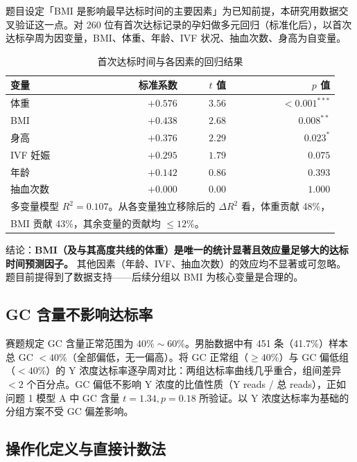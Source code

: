 \documentclass{mcm-paper}
\begin{document}
题目设定「BMI 是影响最早达标时间的主要因素」为已知前提，本研究用数据交叉验证这一点。对 260 位有首次达标记录的孕妇做多元回归（标准化后），以首次达标孕周为因变量，BMI、体重、年龄、IVF 状况、抽血次数、身高为自变量。

\begin{table}[H]
\centering
\caption{首次达标时间与各因素的回归结果}
\begin{tabular}{lrrr}
\toprule
变量 & 标准系数 & $t$ 值 & $p$ 值 \\
\midrule
体重     & $+0.576$ & $3.56$ & $<0.001^{***}$ \\
BMI     & $+0.438$ & $2.68$ & $0.008^{**}$ \\
身高     & $+0.376$ & $2.29$ & $0.023^*$ \\
IVF 妊娠 & $+0.295$ & $1.79$ & $0.075$ \\
年龄     & $+0.142$ & $0.86$ & $0.393$ \\
抽血次数   & $+0.000$ & $0.00$ & $1.000$ \\
\bottomrule
\multicolumn{4}{l}{\footnotesize 多变量模型 $R^2=0.107$。从各变量独立移除后的 $\Delta R^2$ 看，体重贡献 48\%，} \\
\multicolumn{4}{l}{\footnotesize BMI 贡献 43\%，其余变量的贡献均 $\leq 12\%$。} \\
\end{tabular}
\end{table}

结论：\textbf{BMI（及与其高度共线的体重）是唯一的统计显著且效应量足够大的达标时间预测因子。} 其他因素（年龄、IVF、抽血次数）的效应均不显著或可忽略。题目前提得到了数据支持——后续分组以 BMI 为核心变量是合理的。

\subsection{GC 含量不影响达标率}

赛题规定 GC 含量正常范围为 $40\%\sim60\%$。男胎数据中有 451 条（41.7\%）样本总 GC $< 40\%$（全部偏低，无一偏高）。将 GC 正常组（$\geq 40\%$）与 GC 偏低组（$<40\%$）的 Y 浓度达标率逐孕周对比：两组达标率曲线几乎重合，组间差异 $<2$ 个百分点。GC 偏低不影响 Y 浓度的比值性质（Y reads / 总 reads），正如问题 1 模型 A 中 GC 含量 $t=1.34, p=0.18$ 所验证。以 Y 浓度达标率为基础的分组方案不受 GC 偏差影响。

\subsection{操作化定义与直接计数法}
\end{document}
